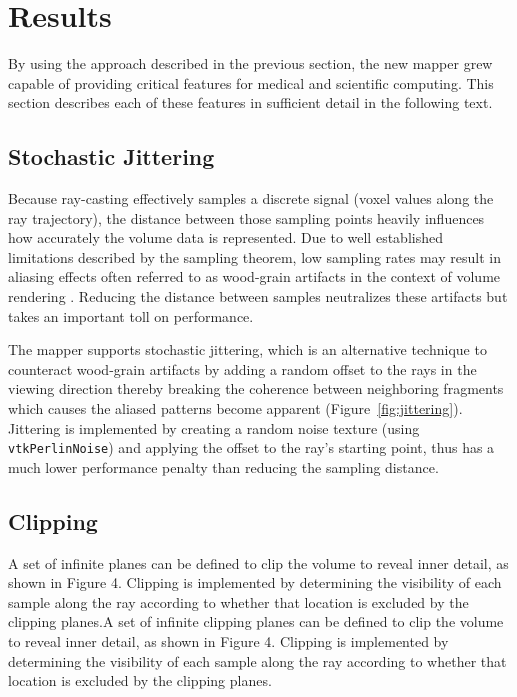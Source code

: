\section{Results}
By using the approach described in the previous section, the new mapper grew
capable of providing critical features for medical and scientific computing.
This section describes each of these features in sufficient detail in the
following text.

\newcommand{\ignore}[1]{}

\subsection{Stochastic Jittering}
Because ray-casting effectively samples a discrete signal (voxel values along
the ray trajectory), the distance between those sampling points heavily
influences how accurately the volume data is represented.  Due to well
established limitations described by the sampling theorem, low sampling rates
may result in aliasing effects often referred to as wood-grain artifacts in the
context of volume rendering \ignore{\cite{RTVG_jittering}}. Reducing the
distance between samples neutralizes these artifacts but takes an important toll
on performance.


The mapper supports stochastic jittering, which is an alternative technique to
counteract wood-grain artifacts by adding a random offset to the rays in the
viewing direction thereby breaking the coherence between neighboring fragments
which causes the aliased patterns become apparent (Figure~\ref{fig:jittering}).
Jittering is implemented by creating a random noise texture (using
\texttt{vtkPerlinNoise}) and applying the offset to the ray's starting point,
thus has a much lower performance penalty than reducing the sampling distance.


\subsection{Clipping}
A set of infinite planes can be defined to clip the volume to reveal inner
detail, as shown in Figure 4.  Clipping is implemented by determining the
visibility of each sample along the ray according to whether that location is
excluded by the clipping planes.A set of infinite clipping planes can be defined
to clip the volume to reveal inner detail, as shown in Figure 4.  Clipping is
implemented by determining the visibility of each sample along the ray according
to whether that location is excluded by the clipping planes.

